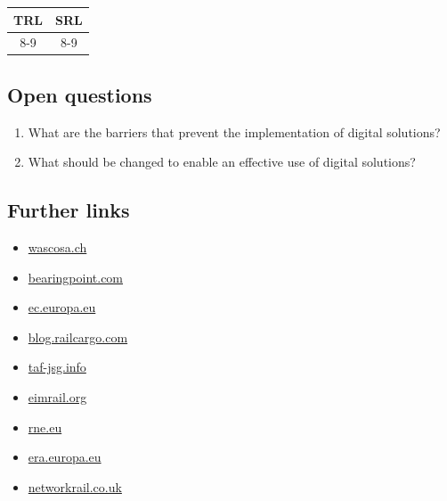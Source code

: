 \documentclass[
]{book}
\providecommand{\tightlist}{%
  \setlength{\itemsep}{0pt}\setlength{\parskip}{0pt}}
\begin{document}
\begin{longtable}[]{@{}cc@{}}
\toprule
TRL & SRL\tabularnewline
\midrule
\endhead
8-9 & 8-9\tabularnewline
\bottomrule
\end{longtable}

\hypertarget{open-questions-21}{%
\subsection*{Open questions}\label{open-questions-21}}

\begin{enumerate}
\def\labelenumi{\arabic{enumi}.}
\tightlist
\item
  What are the barriers that prevent the implementation of digital solutions?
\item
  What should be changed to enable an effective use of digital solutions?
\end{enumerate}

\hypertarget{further-links-19}{%
\subsection*{Further links}\label{further-links-19}}

\begin{itemize}
\tightlist
\item
  \href{https://www.wascosa.ch/infoletter/2016/wascosa-infoletter-25-en.pdf}{wascosa.ch}
\item
  \href{https://www.bearingpoint.com/files/Digitalization_rail_infrastructure_management_PR.pdf?download=0\&itemId=659400}{bearingpoint.com}
\item
  \href{https://ec.europa.eu/transport/modes/rail/useful-links_de}{ec.europa.eu}
\item
  \href{https://blog.railcargo.com/en/artikel/einzelwagenverkehr}{blog.railcargo.com}
\item
  \href{http://taf-jsg.info/wp-content/uploads/2019/05/RU-IM-Telematics-governance-ToR_V1.3_final-14-05-2019.pdf}{taf-jsg.info}
\item
  \href{https://eimrail.org/}{eimrail.org}
\item
  \href{https://rne.eu/}{rne.eu}
\item
  \href{https://www.era.europa.eu/}{era.europa.eu}
\item
  \href{https://www.networkrail.co.uk/industry-and-commercial/information-for-operators/taf-tap/}{networkrail.co.uk}
\end{itemize}
\end{document}
